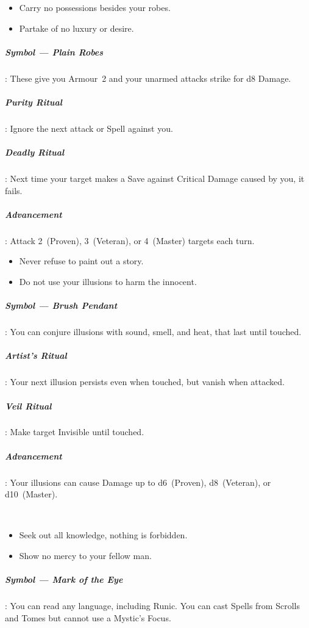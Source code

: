 \documentclass[itdr]{subfiles}
\begin{document}
\vfill

{\em\begin{itemize}
		\item Carry no possessions besides your robes.
		\item Partake of no luxury or desire.
\end{itemize}}

\subparagraph{Symbol --- Plain Robes}: These give you Armour~2 and your unarmed attacks strike for d8 Damage.

\subparagraph{Purity Ritual}: Ignore the next attack or Spell against you.

\subparagraph{Deadly Ritual}: Next time your target makes a Save against Critical Damage caused by you, it fails.

\subparagraph{Advancement}: Attack 2~(Proven), 3~(Veteran), or 4~(Master) targets each turn.

\vfill

{\em\begin{itemize}
		\item Never refuse to paint out a story.
		\item Do not use your illusions to harm the innocent.
\end{itemize}}

\subparagraph{Symbol --- Brush Pendant}: You can conjure illusions with sound, smell, and heat, that last until touched.

\subparagraph{Artist's Ritual}: Your next illusion persists even when touched, but vanish when attacked.

\subparagraph{Veil Ritual}: Make target Invisible until touched.

\subparagraph{Advancement}: Your illusions can cause Damage up to d6~(Proven), d8~(Veteran), or d10~(Master).

\vfill
\break

~\vspace{1.5ex}

{\em\begin{itemize}
		\item Seek out all knowledge, nothing is forbidden.
		\item Show no mercy to your fellow man.
\end{itemize}}

\subparagraph{Symbol --- Mark of the Eye}: You can read any language, including Runic. You can cast Spells from Scrolls and Tomes but cannot use a Mystic's Focus.
\end{document}
